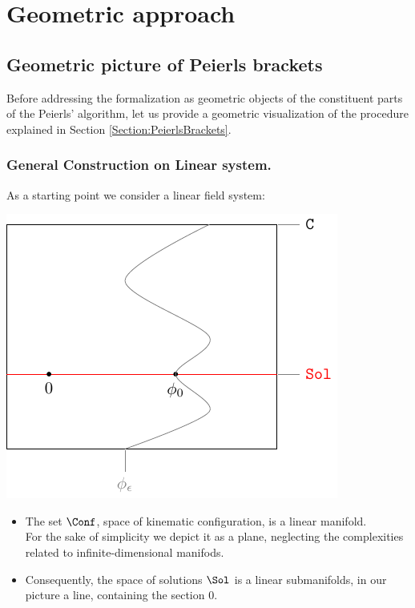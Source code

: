 \documentclass[Main]{subfiles}
\begin{document}
\section{Geometric approach}


	\subsection{Geometric picture of Peierls brackets}
		Before addressing the formalization as geometric objects of the constituent parts of the Peierls' algorithm, let us provide a geometric visualization of the procedure explained in Section \ref{Section:PeierlsBrackets}.
		
		\subsubsection{General Construction on Linear system.}
		As a starting point we consider a linear field system:

		\vspace{1mm}		
		\begin{minipage}{0.5\textwidth}
			\includegraphics[width=\textwidth]{Pictures/GeometricPicture0}
		\end{minipage}
		\begin{minipage}{0.5\textwidth}
			\begin{itemize}
				\item The set $\Conf$, space of kinematic configuration, is a linear manifold.\\
					For the sake of simplicity we depict it as a plane, neglecting the complexities related to infinite-dimensional manifods.
				\item Consequently, the space of solutions $ \Sol$ is a linear submanifolds, in our picture a line, containing the section $0$.
			\end{itemize}
		\end{minipage}
		\vspace{1mm}\\
			
\end{document}
